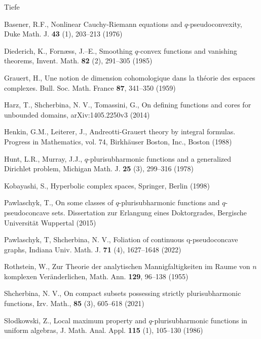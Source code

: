 \documentclass[11pt,a4paper]{article}
\begin{document}

\begin{thebibliography}{Tiefe}

 Basener, R.F., Nonlinear Cauchy-Riemann equations and $q$-pseudoconvexity, Duke Math. J. \textbf{43} (1), 203--213 (1976)

Diederich, K., Forn{\ae}ss, J.--E., Smoothing {$q$}-convex functions and vanishing theorems, Invent. Math. \textbf{82} (2), 291–305 (1985)

 Grauert, H., Une notion de dimension cohomologique dans la th\'eorie des espaces complexes. Bull. Soc. Math. France \textbf{87}, 341--350 (1959)

Harz, T., Shcherbina, N. V., Tomassini, G., On defining functions and cores for unbounded domains, arXiv:1405.2250v3 (2014)

 Henkin, G.M., Leiterer, J., Andreotti-Grauert theory by integral formulas. Progress in Mathematics, vol. 74, Birkh\"auser Boston, Inc., Boston (1988)

Hunt, L.R., Murray, J.J., {$q$}-plurisubharmonic functions and a generalized {D}irichlet problem, Michigan Math. J. \textbf{25} (3), 299--316 (1978)

 Kobayashi, S., Hyperbolic complex spaces, Springer, Berlin (1998) %

 Pawlaschyk, T., On some classes of $q$-plurisubharmonic functions and $q$-pseudoconcave sets. Dissertation zur Erlangung eines Doktorgrades, Bergische Universit\"at Wuppertal (2015)

 Pawlaschyk, T, Shcherbina, N. V., Foliation of continuous q-pseudoconcave graphs, Indiana Univ. Math. J. \textbf{71} (4), 1627–1648 (2022)




 Rothstein, W., Zur Theorie der analytischen Mannigfaltigkeiten im Raume von $n$ komplexen Ver\"anderlichen, Math. Ann. \textbf{129}, 96--138 (1955)

Shcherbina, N. V., On compact subsets possessing strictly plurisubharmonic functions, Izv. Math., \textbf{85} (3), 605–618 (2021)

 S{\l}odkowski, Z., Local maximum property and $q$-plurisubharmonic functions in
uniform algebras, J. Math. Anal. Appl. \textbf{115} (1), 105--130 (1986)




\end{thebibliography}
\end{document}
